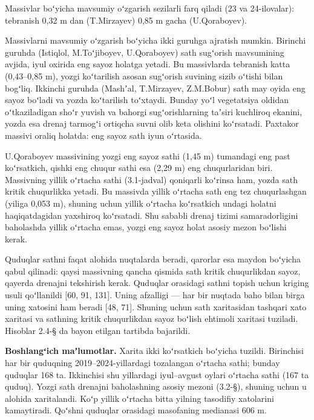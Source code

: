 Massivlar boʻyicha mavsumiy oʻzgarish sezilarli farq qiladi (23 va
24-ilovalar): tebranish 0,32 m dan (T.Mirzayev) 0,85 m gacha
(U.Qoraboyev).

Massivlarni mavsumiy oʻzgarish boʻyicha ikki guruhga ajratish mumkin.
Birinchi guruhda (Istiqlol, M.Toʻjiboyev, U.Qoraboyev) sath sugʻorish
mavsumining avjida, iyul oxirida eng sayoz holatga yetadi. Bu
massivlarda tebranish katta (0,43--0,85 m), yozgi koʻtarilish asosan
sugʻorish suvining sizib oʻtishi bilan bogʻliq. Ikkinchi guruhda
(Mashʼal, T.Mirzayev, Z.M.Bobur) sath may oyida eng sayoz boʻladi va
yozda koʻtarilish toʻxtaydi. Bunday yoʻl vegetatsiya oldidan
oʻtkaziladigan shoʻr yuvish va bahorgi sugʻorishlarning taʼsiri
kuchliroq ekanini, yozda esa drenaj tarmogʻi ortiqcha suvni olib keta
olishini koʻrsatadi. Paxtakor massivi oraliq holatda: eng sayoz sath
iyun oʻrtasida.

U.Qoraboyev massivining yozgi eng sayoz sathi (1,45 m) tumandagi eng
past koʻrsatkich, qishki eng chuqur sathi esa (2,29 m) eng chuqurlaridan
biri. Massivning yillik oʻrtacha sathi (3.1-jadval) qoniqarli koʻrinsa
ham, yozda sath kritik chuqurlikka yetadi. Bu massivda yillik oʻrtacha
sath eng tez chuqurlashgan (yiliga 0,053 m), shuning uchun yillik
oʻrtacha koʻrsatkich undagi holatni haqiqatdagidan yaxshiroq koʻrsatadi.
Shu sababli drenaj tizimi samaradorligini baholashda yillik oʻrtacha
emas, yozgi eng sayoz holat asosiy mezon boʻlishi kerak.


Quduqlar sathni faqat alohida nuqtalarda beradi, qarorlar esa maydon
boʻyicha qabul qilinadi: qaysi massivning qancha qismida sath kritik
chuqurlikdan sayoz, qayerda drenajni tekshirish kerak. Quduqlar
orasidagi sathni topish uchun kriging usuli qoʻllanildi {[}60, 91,
131{]}. Uning afzalligi --- har bir nuqtada baho bilan birga uning
xatosini ham beradi {[}48, 71{]}. Shuning uchun sath xaritasidan
tashqari xato xaritasi va sathning kritik chuqurlikdan sayoz boʻlish
ehtimoli xaritasi tuziladi. Hisoblar 2.4-§ da bayon etilgan tartibda
bajarildi.

\textbf{Boshlangʻich maʼlumotlar.} Xarita ikki koʻrsatkich boʻyicha
tuzildi. Birinchisi har bir quduqning 2019--2024-yillardagi tozalangan
oʻrtacha sathi; bunday quduqlar 168 ta. Ikkinchisi shu yillardagi
iyul--avgust oylari oʻrtacha sathi (167 ta quduq). Yozgi sath drenajni
baholashning asosiy mezoni (3.2-§), shuning uchun u alohida xaritalandi.
Koʻp yillik oʻrtacha bitta yilning tasodifiy xatolarini kamaytiradi.
Qoʻshni quduqlar orasidagi masofaning medianasi 606 m.

